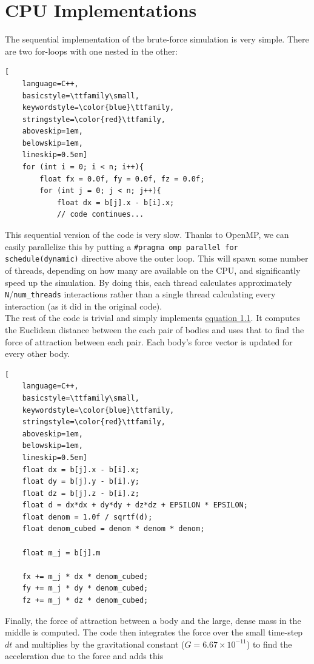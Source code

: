 \section{CPU Implementations}
The sequential implementation of the brute-force simulation is very simple. There are two
for-loops with one nested in the other:
\begin{lstlisting}[
    language=C++,
    basicstyle=\ttfamily\small,
    keywordstyle=\color{blue}\ttfamily,
    stringstyle=\color{red}\ttfamily,
    aboveskip=1em,
    belowskip=1em,
    lineskip=0.5em]
    for (int i = 0; i < n; i++){
        float fx = 0.0f, fy = 0.0f, fz = 0.0f;
        for (int j = 0; j < n; j++){
            float dx = b[j].x - b[i].x;
            // code continues...
\end{lstlisting}
This sequential version of the code is very slow. Thanks to OpenMP, 
we can easily parallelize this by putting a \verb|#pragma omp parallel for schedule(dynamic)| directive above the outer loop. 
This will spawn some number of threads, depending on how many are available on the CPU, and 
significantly speed up the simulation. By doing this, each thread calculates approximately \verb|N|/\verb|num_threads|
interactions rather than a single thread calculating every interaction (as it did in the original code). \\
\indent The rest of the code is trivial and simply implements \hyperref[sec:grav]{equation 1.1}. It computes the 
Euclidean distance between the each pair of bodies and uses that to find the force of attraction between each pair. 
Each body's force vector is updated for every other body. 
\begin{lstlisting}[
    language=C++,
    basicstyle=\ttfamily\small,
    keywordstyle=\color{blue}\ttfamily,
    stringstyle=\color{red}\ttfamily,
    aboveskip=1em,
    belowskip=1em,
    lineskip=0.5em]
    float dx = b[j].x - b[i].x;
    float dy = b[j].y - b[i].y;
    float dz = b[j].z - b[i].z;
    float d = dx*dx + dy*dy + dz*dz + EPSILON * EPSILON;
    float denom = 1.0f / sqrtf(d);
    float denom_cubed = denom * denom * denom;

    float m_j = b[j].m

    fx += m_j * dx * denom_cubed; 
    fy += m_j * dy * denom_cubed; 
    fz += m_j * dz * denom_cubed;
\end{lstlisting}
Finally, the force of attraction between a body and the large, dense mass in the middle is computed. 
The code then integrates the force over the small time-step $dt$ 
and multiplies by the gravitational constant ($G = 6.67 \times 10^{-11}$) to find the acceleration due to the force and adds this 
